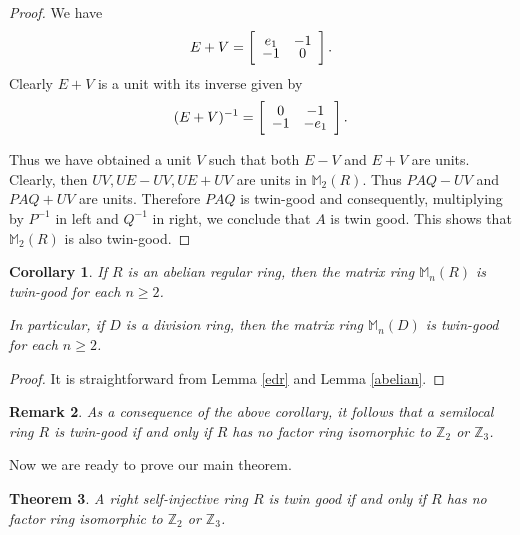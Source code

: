 \documentclass{amsart}
\newtheorem{theorem}{Theorem}
\newtheorem{corollary}[theorem]{Corollary}
\newtheorem{remark}[theorem]{Remark}
\begin{document}
\begin{proof}
We have \[E+V=\left[
\begin{array}{cc}
e_{1} & -1 \\
\noalign{\vspace{-0.3em}}
-1 & 0
\end{array}
\right] .\] Clearly $E+V$ is a unit with its inverse given by 
\[(E+V)^{-1}=\left[
\begin{array}{cc}
0 & -1 \\
\noalign{\vspace{-0.3em}}
-1 & -e_1
\end{array}
\right]. \]  

\noindent Thus we have obtained a unit $V$ such that both $E-V$ and $E+V$ are units. Clearly, then $UV,UE-UV,UE+UV$ are units in $\mathbb M_2(R)$. Thus $PAQ-UV$ and $PAQ+UV$ are units. Therefore $PAQ$ is twin-good and consequently, multiplying by $P^{-1}$ in left and $Q^{-1}$ in right, we conclude that $A$ is twin good. This shows that $\mathbb M_2(R)$ is also twin-good.
\end{proof}

\begin{corollary} \label{divmatrix}
If $R$ is an abelian regular ring, then the matrix ring $\mathbb M_n(R)$ is twin-good for each $n\ge 2$. 

In particular, if $D$ is a division ring, then the matrix ring $\mathbb M_n(D)$ is twin-good for each $n\ge 2$.
\end{corollary}

\begin{proof}
It is straightforward from Lemma \ref{edr} and Lemma \ref{abelian}.
\end{proof}

\begin{remark}
As a consequence of the above corollary, it follows that a semilocal ring $R$ is twin-good if and only if $R$ has no factor ring isomorphic to $\mathbb Z_2$ or $\mathbb Z_3$.  
\end{remark}

\bigskip

\noindent Now we are ready to prove our main theorem.

\begin{theorem}\label{main} A right self-injective ring $R$ is twin good if and only if $R$ has no factor ring isomorphic to $\mathbb Z_2$ or $\mathbb Z_{3}$.
\end{theorem}
\end{document}
